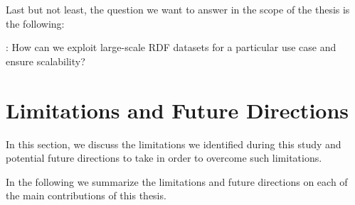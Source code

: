 Last but not least, the question we want to answer in the scope of the thesis is the following:

\begin{tcolorbox}
\textbf{\rqNr[RQ4]\label{rqc:4}}: How can we exploit large-scale \gls{RDF} datasets for a particular use case and ensure scalability?
\end{tcolorbox}


\section{Limitations and Future Directions}
In this section, we discuss the limitations we identified during this study and potential future directions to take in order to overcome such limitations.

In the following we summarize the limitations and future directions on each of the main contributions of this thesis.

